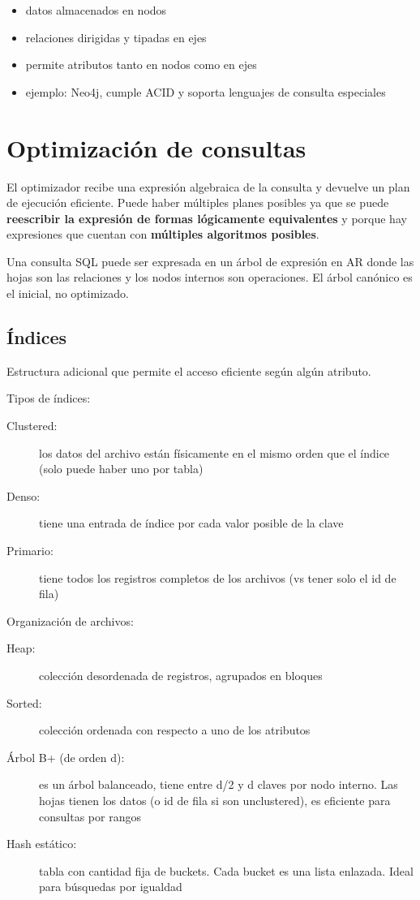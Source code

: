 \begin{itemize}
	\item datos almacenados en nodos
	\item relaciones dirigidas y tipadas en ejes
	\item permite atributos tanto en nodos como en ejes
	\item ejemplo: Neo4j, cumple ACID y soporta lenguajes de consulta especiales
\end{itemize}

\section{Optimización de consultas}

El optimizador recibe una expresión algebraica de la consulta y devuelve un plan de ejecución eficiente.
Puede haber múltiples planes posibles ya que se puede \textbf{reescribir la expresión de formas lógicamente equivalentes} y porque hay expresiones que cuentan con \textbf{múltiples algoritmos posibles}.

Una consulta SQL puede ser expresada en un árbol de expresión en AR donde las hojas son las relaciones y los nodos internos son operaciones.
El árbol canónico es el inicial, no optimizado.

\subsection{Índices}

Estructura adicional que permite el acceso eficiente según algún atributo.

Tipos de índices:

\begin{description}
	\item[Clustered:] los datos del archivo están físicamente en el mismo orden que el índice (solo puede haber uno por tabla)
	\item[Denso:] tiene una entrada de índice por cada valor posible de la clave
	\item[Primario:] tiene todos los registros completos de los archivos (vs tener solo el id de fila)
\end{description}

Organización de archivos:

\begin{description}
	\item[Heap:] colección desordenada de registros, agrupados en bloques
	\item[Sorted:] colección ordenada con respecto a uno de los atributos
	\item[Árbol B+ (de orden d):] es un árbol balanceado, tiene entre d/2 y d claves por nodo interno. Las hojas tienen los datos (o id de fila si son unclustered), es eficiente para consultas por rangos
	\item[Hash estático:] tabla con cantidad fija de buckets. Cada bucket es una lista enlazada. Ideal para búsquedas por igualdad
\end{description}

